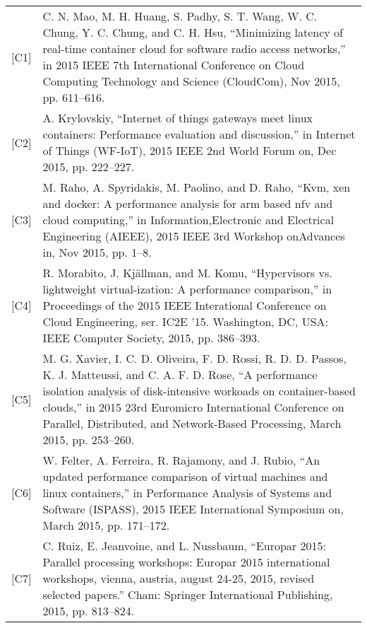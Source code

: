\begin{table}[]
\begin{tabular}{lp{13cm}}
{[}C1{]}  & C. N. Mao, M. H. Huang, S. Padhy, S. T. Wang, W. C. Chung, Y. C. Chung, and C. H. Hsu, “Minimizing latency of real-time container cloud for software radio access networks,” in 2015 IEEE 7th International Conference on Cloud Computing Technology and Science (CloudCom), Nov 2015, pp. 611–616.                                  \\
{[}C2{]}  & A. Krylovskiy, “Internet of things gateways meet linux containers: Performance evaluation and discussion,” in Internet of Things (WF-IoT), 2015 IEEE 2nd World Forum on, Dec 2015, pp. 222–227.                                                                                                                                      \\
{[}C3{]}  & M. Raho, A. Spyridakis, M. Paolino, and D. Raho, “Kvm, xen and docker: A performance analysis for arm based nfv and cloud computing,” in Information,Electronic and Electrical Engineering (AIEEE), 2015 IEEE 3rd Workshop onAdvances in, Nov 2015, pp. 1–8.                                                                         \\
{[}C4{]}  & R. Morabito, J. Kj\"allman, and M. Komu, “Hypervisors vs. lightweight virtual-ization: A performance comparison,” in Proceedings of the 2015 IEEE Interational Conference on Cloud Engineering, ser. IC2E ’15. Washington, DC, USA: IEEE Computer Society, 2015, pp. 386–393.                                                      \\
{[}C5{]}  & M. G. Xavier, I. C. D. Oliveira, F. D. Rossi, R. D. D. Passos, K. J. Matteussi, and C. A. F. D. Rose, “A performance isolation analysis of disk-intensive workoads on container-based clouds,” in 2015 23rd Euromicro International Conference on Parallel, Distributed, and Network-Based Processing, March 2015, pp. 253–260. \\
{[}C6{]}  & W. Felter, A. Ferreira, R. Rajamony, and J. Rubio, “An updated performance comparison of virtual machines and linux containers,” in Performance Analysis of Systems and Software (ISPASS), 2015 IEEE International Symposium on, March 2015, pp. 171–172.                                                                            \\
{[}C7{]}  & C. Ruiz, E. Jeanvoine, and L. Nussbaum, “Europar 2015: Parallel processing workshops: Europar 2015 international workshops, vienna, austria, august 24-25, 2015, revised selected papers.” Cham: Springer International Publishing, 2015, pp. 813–824.  \\

\end{tabular}
\end{table}
